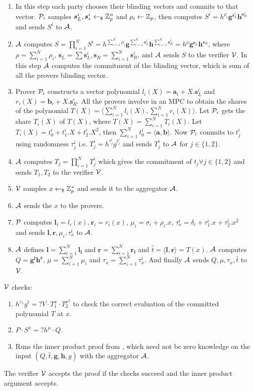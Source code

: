 \begin{enumerate}
	\item In this step each party chooses their blinding vectors and commits to that vector. ${\cal P}_i$ samples $\bm{s}^i_L, \bm{s}^i_r \leftarrow_\$ {\mathbb Z}_p^n$ and $\rho_i\leftarrow {\mathbb Z}_p$, then computes $S^i=h^{\rho_i}\bm{g}^{\bm{s}^i_L}\bm{h}^{\bm{s}^i_R}$ and sends $S^i$ to ${\cal A}$.
	\item ${\cal A}$ computes $S = \prod_{i=1}^{N}S^i = h^{\sum_{i=1}^N\rho_i}\bm{g}^{\sum_{i=1}^N\bm{s}_L^i}\bm{h}^{\sum_{i=1}^N\bm{s}^i_R} = h^{\rho}\bm{g}^{\bm{s}_L}\bm{h}^{\bm{s}_R}$, where $\rho = \sum_{i=1}^{N}\rho_i$, $\bm{s}_L =\sum\limits \bm{s}^i_L,  \bm{s}_R=\sum_{i=1}^{N}\bm{s}^i_R$, and ${\cal A}$ sends $S$ to the verifier ${\cal V}$. In this step ${\cal A}$ computes the commitment of the blinding vector, which is sum of all the provers blinding vector.
	\item Prover ${\cal P}_i$ constructs a vector polynomial $l_i(X)=\bm{a}_i + X. \bm{s}^i_L$ and $r_i(X)=\bm{b}_i + X. \bm{s}^i_R$. All the provers involve in an MPC to obtain the shares of the polynomial $T(X)=\langle \sum_{i=1}^N l_i(X),\sum_{i=1}^N r_i(X)\rangle$. Let ${\cal P}_i$ gets the share $T_i(X)$ of $T(X)$, where $T(X)=\sum_{i=1}^{N}T_i(X)$. Let $T_i(X)= t^i_0+t^i_1.X+t^i_2.X^2$, then $\sum_{i=1}^N t^i_0=\langle \bm{a}, \bm{b} \rangle$. Now ${\cal P}_i$ commits to $t^i_j$ using randomness $\tau^i_j$ i.e. $T^i_j=h^{\tau^i_j}g^{t^i_j}$ and sends $T^i_j$ to ${\cal A}$ for $j\in \{1,2\}$.
	\item ${\cal A}$ computes $T_j=\prod_{i=1}^{N} T^i_j$ which gives the commitment of $t_j \forall j\in\{1,2\}$ and sends $T_1,T_2$ to the verifier ${\cal V}$.
	\item ${\cal V}$ samples $x\leftarrow_\${\mathbb Z}^*_p$ and sends it to the aggregator ${\cal A}$.
	\item ${\cal A}$ sends the $x$ to the provers. 
	\item ${\cal P}$ computes $\bm{l}_i=l_i(x), \bm{r}_i=r_i(x)$, $\mu_i= \sigma_i+\rho_i.x$, $\tau^i_x= \delta_i+\tau^i_1.x+\tau^i_2.x^2$ and sends $\bm{l},\bm{r}, \mu_i, \tau^i_x$ to ${\cal A}$.
	\item ${\cal A}$ defines $\bm{l}=\sum_{i=1}^N\bm{l_i}$ and $\bm{r}=\sum_{i=1}^N\bm{r_i}$ and $\hat{t}=\langle \bm{l},\bm{r}\rangle =T(x)$. ${\cal A}$ computes $Q=\bm{g^lh^r}$, $\mu=\sum_{i=1}^N \mu_i$ and $\tau_x= \sum_{i=1}^{N}\tau_x^i$. And finally ${\cal A}$ sends $Q, \mu, \tau_x, \hat{t}$ to ${\cal V}$.
\end{enumerate}
${\cal V}$ checks: 
\begin{enumerate}
	\item $h^{\tau_x}g^{\hat{t}}=?V\cdot T_1^x\cdot T_2^{x^2}$ to check the correct evaluation of the committed polynomial $T$ at $x$.
	\item $P\cdot S^x =? h^{\mu}\cdot Q$. 
	\item Runs the inner product proof from \cite{Bulletproofs}, which need not be zero knowledge on the input $(Q, \hat{t}, \bm{g}, \bm{h}, g)$ with the aggregator ${\cal A}$.
\end{enumerate}
The verifier ${\cal V}$ accepts the proof if the checks succeed and the inner product argument accepts.


